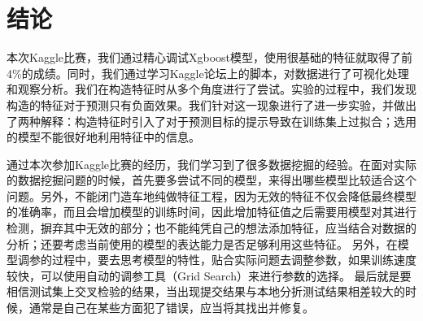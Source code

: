 \section{结论}
\label{sec:conclusion}

本次Kaggle比赛，我们通过精心调试Xgboost模型，使用很基础的特征就取得了前4\%的成绩。同时，我们通过学习Kaggle论坛上的脚本，对数据进行了可视化处理和观察分析。我们在构造特征时从多个角度进行了尝试。实验的过程中，我们发现构造的特征对于预测只有负面效果。我们针对这一现象进行了进一步实验，并做出了两种解释：构造特征时引入了对于预测目标的提示导致在训练集上过拟合；选用的模型不能很好地利用特征中的信息。

通过本次参加Kaggle比赛的经历，我们学习到了很多数据挖掘的经验。在面对实际的数据挖掘问题的时候，首先要多尝试不同的模型，来得出哪些模型比较适合这个问题。另外，不能闭门造车地纯做特征工程，因为无效的特征不仅会降低最终模型
的准确率，而且会增加模型的训练时间，因此增加特征值之后需要用模型对其进行检测，摒弃其中无效的部分；也不能纯凭自己的想法添加特征，应当结合对数据的分析；还要考虑当前使用的模型的表达能力是否足够利用这些特征。
另外，在模型调参的过程中，要去思考模型的特性，贴合实际问题去调整参数，如果训练速度较快，可以使用自动的调参工具（Grid Search）来进行参数的选择。
最后就是要相信测试集上交叉检验的结果，当出现提交结果与本地分折测试结果相差较大的时候，通常是自己在某些方面犯了错误，应当将其找出并修复。